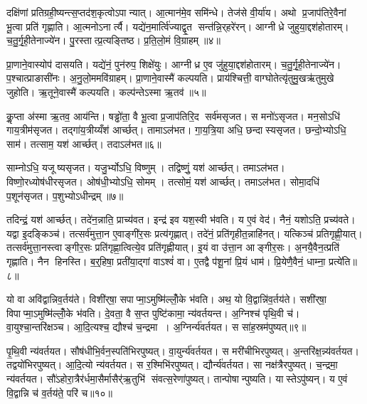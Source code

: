 दक्षि॑णां प्रतिग्रही॒ष्यन्त्स॒प्तद॑श॒कृत्वोऽपान्यात्। आ॒त्मान॑मे॒व समि॑न्धे। तेज॑से वी॒र्या॑य। अथो प्र॒जाप॑तिरे॒वैनां भू॒त्वा प्रति॑ गृह्णाति। आ॒त्मनोऽनार्त्यै। यद्ये॑न॒मार्त्वि॑ज्याद्वृ॒त सन्त॑न्नि॒र्‌हरे॑रन्। आग्नीध्रे जुहुया॒द्दश॑होतारम्। च॒तु॒र्गृ॒ही॒तेनाज्ये॑न। पु॒रस्तात्प्र॒त्यङ्तिष्ठ\sn{}। प्र॒ति॒लो॒मं वि॒ग्राहम्॥४॥

प्रा॒णाने॒वास्योप॑ दासयति। यद्ये॑नं॒ पुन॑रुप॒ शिक्षे॑युः। आग्नीध्र ए॒व जु॑हुया॒द्दश॑होतारम्। च॒तु॒र्गृ॒ही॒तेनाज्ये॑न। प॒श्चात्प्राङासी॑नः। अ॒नु॒लो॒ममवि॑ग्राहम्। प्रा॒णाने॒वास्मै॑ कल्पयति। प्राय॑श्चित्ती॒ वाग्घोतेत्यृ॑तुमु॒खऋ॑तुमुखे जुहोति। ऋ॒तूने॒वास्मै॑ कल्पयति। कल्प॑न्तेऽस्मा ऋ॒तव॑॥५॥

कॢ॒प्ता अ॑स्मा ऋ॒तव॒ आय॑न्ति। षड्ढो॑ता॒ वै भू॒त्वा प्र॒जाप॑तिरि॒द सर्व॑मसृजत। स मनो॑ऽसृजत। मन॒सोऽधि॑ गाय॒त्रीम॑सृजत। तद्गा॑य॒त्रीय्यँश॑ आर्च्छत्। तामाऽल॑भत। गा॒य॒त्रि॒या अधि॒ छन्दास्यसृजत। छन्दो॒भ्योऽधि॒ साम॑। तत्साम॒ यश॑ आर्च्छत्। तदाऽल॑भत॥६॥

साम्नोऽधि॒ यजूष्यसृजत। यजु॒र्भ्योऽधि॒ विष्णुम्। तद्विष्णुं॒ यश॑ आर्च्छत्। तमाऽल॑भत। विष्णो॒रध्योष॑धीरसृजत। ओष॑धी॒भ्योऽधि॒ सोमम्। तत्सोमं॒ यश॑ आर्च्छत्। तमाऽल॑भत। सोमा॒दधि॑ प॒शून॑सृजत। प॒शुभ्योऽधीन्द्रम्॥७॥

तदिन्द्रं॒ यश॑ आर्च्छत्। तदे॑न॒न्नाति॒ प्राच्य॑वत। इन्द्र॑ इव यश॒स्वी भ॑वति। य ए॒वं वेद॑। नैनं॒ यशोऽति॒ प्रच्य॑वते। यद्वा इ॒दङ्किञ्च॑। तत्सर्व॑मुत्ता॒न ए॒वाङ्गी॑र॒सः प्रत्य॑गृह्णात्। तदे॑नं॒ प्रति॑गृहीत॒न्नाहि॑नत्। यत्किञ्च॑ प्रतिगृह्णी॒यात्। तत्सर्व॑मुत्ता॒नस्त्वाङ्गीर॒सः प्रति॑गृह्णा॒त्वित्ये॒व प्रति॑गृह्णीयात्। इ॒यं वा उ॑त्ता॒न आङ्गीर॒सः। अ॒नयै॒वैन॒त्प्रति॑ गृह्णाति। नैन हिनस्ति। ब॒र्॒हिषा॒ प्रती॑या॒द्गां वाऽश्वं॑ वा। ए॒तद्वै प॑शू॒नां प्रि॒यं धाम॑। प्रि॒येणै॒वैनं॒ धाम्ना॒ प्रत्ये॑ति॥८॥\anuvakamend[वि॒ग्राह॑मृ॒तव॒स्तदाऽल॑भ॒तेन्द्र॑ङ्गृह्णीया॒थ्षट्च॑]

यो वा अवि॑द्वान्निव॒र्तय॑ते। विशी॑र्‌षा॒ सपाप्मा॒ऽमुष्मि॑ल्लोँ॒के भ॑वति। अथ॒ यो वि॒द्वान्नि॑व॒र्तय॑ते। सशी॑र्‌षा॒ विपाप्मा॒ऽमुष्मि॑ल्लोँ॒के भ॑वति। दे॒वता॒ वै स॒प्त पुष्टि॑कामा॒ न्य॑वर्तयन्त। अ॒ग्निश्च॑ पृथि॒वी च॑। वा॒युश्चा॒न्तरि॑क्षञ्च। आ॒दि॒त्यश्च॒ द्यौश्च॑ च॒न्द्रमा। अ॒ग्निर्न्य॑वर्तयत। स सा॑ह॒स्रम॑पुष्यत्॥९॥

पृ॒थि॒वी न्य॑वर्तयत। सौष॑धीभि॒र्वन॒स्पति॑भिरपुष्यत्। वा॒युर्न्य॑वर्तयत। स मरी॑चीभिरपुष्यत्। अ॒न्तरि॑क्ष॒न्न्य॑वर्तयत। तद्वयो॑भिरपुष्यत्। आ॒दि॒त्यो न्य॑वर्तयत। स र॒श्मिभि॑रपुष्यत्। द्यौर्न्य॑वर्तयत। सा नक्ष॑त्रैरपुष्यत्। च॒न्द्रमा॒ न्य॑वर्तयत। सौ॑ऽहोरा॒त्रैर॑र्धमा॒सैर्मासैर्॑ऋ॒तुभि॑ संवत्स॒रेणा॑पुष्यत्। तान्पोषान्पुष्यति। यास्तेऽपु॑ष्यन्। य ए॒वं वि॒द्वान्नि च॑ व॒र्तय॑ते॒ परि॑ च॥१०॥\anuvakamend[अ॒पु॒ष्य॒न्नक्ष॑त्रैरपुष्य॒त्पञ्च॑ च]

